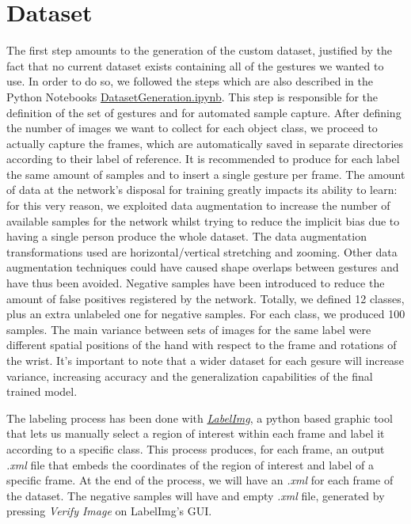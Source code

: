 \documentclass[a4paper, 12pt]{article}
\begin{document}
\section{Dataset}
\begin{flushleft}
The first step amounts to the generation of the custom dataset, justified by the fact that no current dataset exists containing all of the gestures we wanted to use.
In order to do so, we followed the steps which are also described in the Python Notebooks \href{https://github.com/MarzioVallero/ML-Based-Blender-Gestural-Input-Interface/blob/master/DatasetGeneration.ipynb}{DatasetGeneration.ipynb}.\linebreak
This step is responsible for the definition of the set of gestures and for automated sample capture. After defining the number of images we want to collect for each object class, we proceed to actually capture the frames, which are automatically saved in separate directories according to their label of reference. It is recommended to produce for each label the same amount of samples and to insert a single gesture per frame.\linebreak
The amount of data at the network's disposal for training greatly impacts its ability to learn: for this very reason, we exploited data augmentation to increase the number of available samples for the network whilst trying to reduce the implicit bias due to having a single person produce the whole dataset. The data augmentation transformations used are horizontal/vertical stretching and zooming. Other data augmentation techniques could have caused shape overlaps between gestures and have thus been avoided. Negative samples have been introduced to reduce the amount of false positives registered by the network.\linebreak
Totally, we defined 12 classes, plus an extra unlabeled one for negative samples. For each class, we produced 100 samples.\linebreak
The main variance between sets of images for the same label were different spatial positions of the hand with respect to the frame and rotations of the wrist.\linebreak
It's important to note that a wider dataset for each gesure will increase variance, increasing accuracy and the generalization capabilities of the final trained model.

The labeling process has been done with \textit{\hyperref[Ref11]{LabelImg}}, a python based graphic tool that lets us manually select a region of interest within each frame and label it according to a specific class.
This process produces, for each frame, an output \textit{.xml} file that embeds the coordinates of the region of interest and label of a specific frame. At the end of the process, we will have an \textit{.xml} for each frame of the dataset. The negative samples will have and empty \textit{.xml} file, generated by pressing \textit{Verify Image} on LabelImg's GUI.\linebreak


\end{flushleft}
\end{document}
